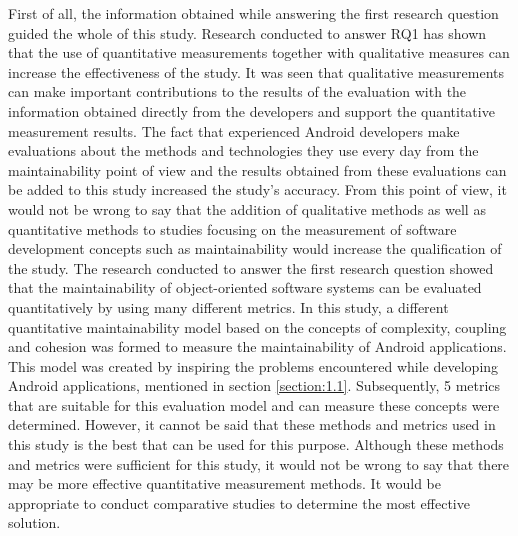 First of all, the information obtained while answering the first research question guided the whole of this study. Research conducted to answer RQ1 has shown that the use of quantitative measurements together with qualitative measures can increase the effectiveness of the study. It was seen that qualitative measurements can make important contributions to the results of the evaluation with the information obtained directly from the developers and support the quantitative measurement results. The fact that experienced Android developers make evaluations about the methods and technologies they use every day from the maintainability point of view and the results obtained from these evaluations can be added to this study increased the study's accuracy. From this point of view, it would not be wrong to say that the addition of qualitative methods as well as quantitative methods to studies focusing on the measurement of software development concepts such as maintainability would increase the qualification of the study. The research conducted to answer the first research question showed that the maintainability of object-oriented software systems can be evaluated quantitatively by using many different metrics. In this study, a different quantitative maintainability model based on the concepts of complexity, coupling and cohesion was formed to measure the maintainability of Android applications. This model was created by inspiring the problems encountered while developing Android applications, mentioned in section \ref{section:1.1}. Subsequently, 5 metrics that are suitable for this evaluation model and can measure these concepts were determined. However, it cannot be said that these methods and metrics used in this study is the best that can be used for this purpose. Although these methods and metrics were sufficient for this study, it would not be wrong to say that there may be more effective quantitative measurement methods. It would be appropriate to conduct comparative studies to determine the most effective solution. 